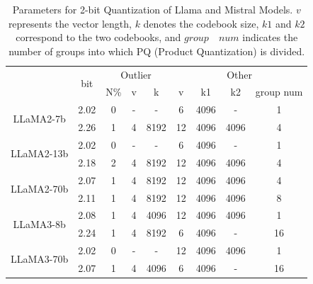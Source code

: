 \begin{table}[hbt!]

\caption{Parameters for 2-bit Quantization of Llama and Mistral Models. $v$ represents the vector length, $k$ denotes the codebook size, $k1$ and $k2$ correspond to the two codebooks, and $group\quad num$ indicates the number of groups into which PQ (Product Quantization) is divided.}
\label{tab:quant_args}
\centering\resizebox{0.62\textwidth}{!}
{
\begin{tabular}{cc|ccc|cccc}
\hline
                            & \multirow{2}{*}{bit} & \multicolumn{3}{c|}{Outlier} & \multicolumn{4}{c}{Other}    \\
                            &                      & N\%      & v      & k        & v  & k1   & k2   & group num \\ \hline
\multirow{2}{*}{LLaMA2-7b}  & 2.02                 & 0        & -      & -        & 6  & 4096 & -    & 1         \\
                            & 2.26                 & 1        & 4      & 8192     & 12 & 4096 & 4096 & 4         \\ \hline
\multirow{2}{*}{LLaMA2-13b} & 2.02                 & 0        & -      & -        & 6  & 4096 & -    & 1         \\
                            & 2.18                 & 2        & 4      & 8192     & 12 & 4096 & 4096 & 4         \\ \hline
\multirow{2}{*}{LLaMA2-70b}                 & 2.07                 & 1        & 4      & 8192     & 12 & 4096 & 4096 & 4         \\
                            & 2.11                 & 1        & 4      & 8192     & 12 & 4096 & 4096 & 8         \\ \hline
\multirow{2}{*}{LLaMA3-8b}  & 2.08                 & 1        & 4      & 4096     & 12 & 4096 & 4096 & 1         \\
                            & 2.24                 & 1        & 4      & 8192     & 6  & 4096 & -    & 16        \\ \hline
\multirow{2}{*}{LLaMA3-70b} & 2.02                 & 0        & -      & -        & 12 & 4096 & 4096 & 1         \\
                            & 2.07                 & 1        & 4      & 4096     & 6  & 4096 & -    & 16        \\ \hline
\end{tabular}%
}
\end{table}